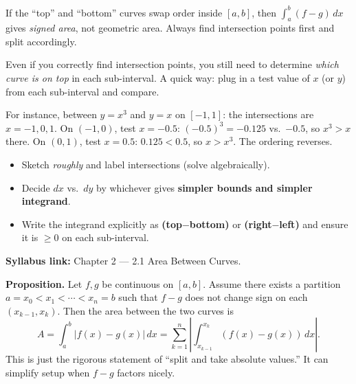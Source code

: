 \begin{commonmistake}[title={Common Mistake: Not Splitting Where the Curves Cross}]
If the ``top'' and ``bottom'' curves swap order inside $[a,b]$, then $\int_a^b(f-g)\,dx$ gives \emph{signed area}, not geometric area.
Always find intersection points first and split accordingly.
\end{commonmistake}

\begin{commonmistake}[title={Common Mistake: Forgetting to check the ordering}]
Even if you correctly find intersection points, you still need to determine \emph{which curve is on top} in each sub-interval. A quick way: plug in a test value of $x$ (or $y$) from each sub-interval and compare.

For instance, between $y=x^3$ and $y=x$ on $[-1,1]$: the intersections are $x=-1,0,1$. On $(-1,0)$, test $x=-0.5$: $(-0.5)^3=-0.125$ vs.\ $-0.5$, so $x^3>x$ there. On $(0,1)$, test $x=0.5$: $0.125<0.5$, so $x>x^3$. The ordering reverses.
\end{commonmistake}

\begin{examtip}[title={Exam Focus: Fast Setup Checklist for Area Problems}]
\begin{itemize}[leftmargin=*]
\item Sketch \emph{roughly} and label intersections (solve algebraically).
\item Decide $dx$ vs.\ $dy$ by whichever gives \textbf{simpler bounds and simpler integrand}.
\item Write the integrand explicitly as \textbf{(top$-$bottom)} or \textbf{(right$-$left)} and ensure it is $\ge 0$ on each sub-interval.
\end{itemize}
\end{examtip}

\begin{extension}[title={Extension (Beyond Syllabus: absolute-value area formula)}]
\textbf{Syllabus link:} Chapter 2 — 2.1 Area Between Curves.

\textbf{Proposition.} Let $f,g$ be continuous on $[a,b]$. Assume there exists a partition
$a=x_0<x_1<\cdots<x_n=b$ such that $f-g$ does not change sign on each $(x_{k-1},x_k)$. Then the area between the two curves is
\[
A = \int_a^b |f(x)-g(x)|\,dx = \sum_{k=1}^n \left|\int_{x_{k-1}}^{x_k}(f(x)-g(x))\,dx\right|.
\]
This is just the rigorous statement of ``split and take absolute values.'' It can simplify setup when $f-g$ factors nicely.
\end{extension}

